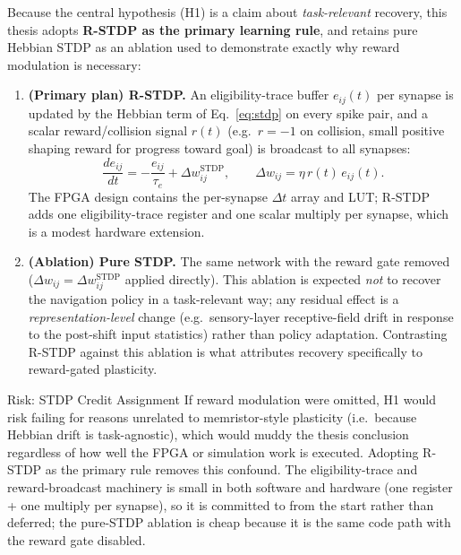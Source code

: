 \documentclass[11pt,a4paper]{article}
\begin{document}
Because the central hypothesis (H1) is a claim about \emph{task-relevant} recovery,
this thesis adopts \textbf{R-STDP as the primary learning rule}, and retains pure
Hebbian STDP as an ablation used to demonstrate exactly why reward modulation is
necessary:

\begin{enumerate}[leftmargin=*, itemsep=3pt]
  \item \textbf{(Primary plan) R-STDP.} An eligibility-trace buffer $e_{ij}(t)$ per
        synapse is updated by the Hebbian term of Eq.~\eqref{eq:stdp} on every spike
        pair, and a scalar reward/collision signal $r(t)$ (e.g.\ $r=-1$ on collision,
        small positive shaping reward for progress toward goal) is broadcast to all
        synapses:
        \begin{equation}
          \frac{de_{ij}}{dt} = -\frac{e_{ij}}{\tau_e} + \Delta w_{ij}^{\text{STDP}},
          \qquad
          \Delta w_{ij} = \eta\, r(t)\, e_{ij}(t).
          \label{eq:rstdp}
        \end{equation}
        The FPGA design contains the per-synapse $\Delta t$ array and LUT; R-STDP adds
        one eligibility-trace register and one scalar multiply per synapse, which is a
        modest hardware extension.
  \item \textbf{(Ablation) Pure STDP.} The same network with the reward gate removed
        ($\Delta w_{ij} = \Delta w_{ij}^{\text{STDP}}$ applied directly). This ablation
        is expected \emph{not} to recover the navigation policy in a task-relevant way;
        any residual effect is a \emph{representation-level} change (e.g.\ sensory-layer
        receptive-field drift in response to the post-shift input statistics) rather
        than policy adaptation. Contrasting R-STDP against this ablation is what
        attributes recovery specifically to reward-gated plasticity.
\end{enumerate}

\begin{riskbox}{Risk: STDP Credit Assignment}
If reward modulation were omitted, H1 would risk failing for reasons unrelated to
memristor-style plasticity (i.e.\ because Hebbian drift is task-agnostic), which would
muddy the thesis conclusion regardless of how well the FPGA or simulation work is
executed. Adopting R-STDP as the primary rule removes this confound. The
eligibility-trace and reward-broadcast machinery is small in both software and hardware
(one register + one multiply per synapse), so it is committed to from the start rather
than deferred; the pure-STDP ablation is cheap because it is the same code path with
the reward gate disabled.
\end{riskbox}
\end{document}
